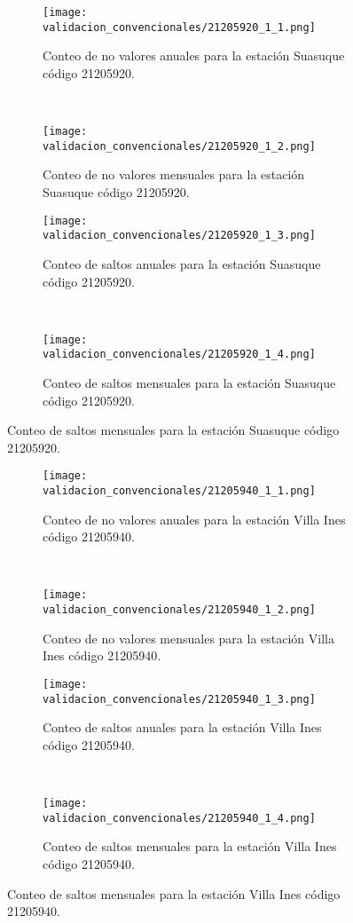 \begin{figure}[H]\ContinuedFloat
\centering
	\begin{subfigure}[normla]{0.4\textwidth}
	\texttt{[image: validacion\_convencionales/21205920\_1\_1.png]}
		\caption{Conteo de no valores anuales para la estación Suasuque    código 21205920.}
		\label{subfig:a1}
		\end{subfigure}
		~
    \begin{subfigure}[normla]{0.4\textwidth}
	\texttt{[image: validacion\_convencionales/21205920\_1\_2.png]}
		\caption{Conteo de no valores mensuales para la estación Suasuque    código 21205920.}
		\label{subfig:a2}
		\end{subfigure}
		
    \begin{subfigure}[normla]{0.4\textwidth}
	\texttt{[image: validacion\_convencionales/21205920\_1\_3.png]}
		\caption{Conteo de saltos anuales para la estación Suasuque    código 21205920.}
		\label{subfig:a1}
		\end{subfigure}
		~
    \begin{subfigure}[normla]{0.4\textwidth}
	\texttt{[image: validacion\_convencionales/21205920\_1\_4.png]}
		\caption{Conteo de saltos mensuales para la estación Suasuque    código 21205920.}
		\label{subfig:a2}
		\end{subfigure}

	
\end{figure}
           
\begin{figure}[H]\ContinuedFloat
\centering
	\begin{subfigure}[normla]{0.4\textwidth}
	\texttt{[image: validacion\_convencionales/21205940\_1\_1.png]}
		\caption{Conteo de no valores anuales para la estación Villa Ines código 21205940.}
		\label{subfig:a1}
		\end{subfigure}
		~
    \begin{subfigure}[normla]{0.4\textwidth}
	\texttt{[image: validacion\_convencionales/21205940\_1\_2.png]}
		\caption{Conteo de no valores mensuales para la estación Villa Ines código 21205940.}
		\label{subfig:a2}
		\end{subfigure}
		
    \begin{subfigure}[normla]{0.4\textwidth}
	\texttt{[image: validacion\_convencionales/21205940\_1\_3.png]}
		\caption{Conteo de saltos anuales para la estación Villa Ines código 21205940.}
		\label{subfig:a1}
		\end{subfigure}
		~
    \begin{subfigure}[normla]{0.4\textwidth}
	\texttt{[image: validacion\_convencionales/21205940\_1\_4.png]}
		\caption{Conteo de saltos mensuales para la estación Villa Ines código 21205940.}
		\label{subfig:a2}
		\end{subfigure}

	
\end{figure}
           
